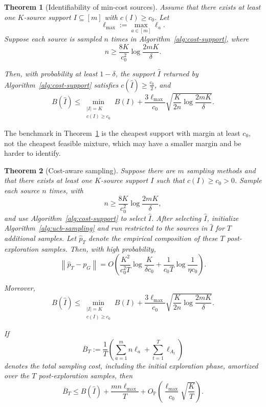 \documentclass[twoside]{article}
\newtheorem{theorem}{Theorem}
\begin{document}
\begin{theorem}[Identifiability of min-cost sources]
\label{thm:cost-support}
Assume that there exists at least one \(K\)-source support \(I\subseteq[m]\)
with $c(I)\geq c_0$. 
Let
\[
\ell_{\max}:=\max_{a\in[m]}\ell_a.
\]
Suppose each source is sampled \(n\) times in
Algorithm~\ref{alg:cost-support}, where
\[
n
\geq
\frac{8K}{c_0^2}
\log\frac{2mK}{\delta}.
\]

Then, with probability at least \(1-\delta\), the support
\(\widehat I\) returned by Algorithm~\ref{alg:cost-support} satisfies $c(\widehat I)\geq \frac{c_0}{2}$, 
and
\[
B(\widehat I)
\leq
\min_{\substack{|I|=K\\ c(I)\geq c_0}}
B(I)
+
\frac{3\ell_{\max}}{c_0}
\sqrt{
\frac{K}{2n}
\log\frac{2mK}{\delta}
}.
\]
\end{theorem}
The benchmark in Theorem~\ref{thm:cost-support} is the cheapest support
with margin at least \(c_0\), not the cheapest feasible mixture, which may
have a smaller margin and be harder to identify. 
\begin{theorem}[Cost-aware sampling]
\label{thm:cost-aware}
Suppose there are \(m\) sampling methods and that there exists at least one
\(K\)-source support \(I\) such that \(c(I)\ge c_0>0\). Sample each source
\(n\) times, with
\[
n\ge
\frac{8K}{c_0^2}
\log\frac{2mK}{\delta},
\]
and use Algorithm~\ref{alg:cost-support} to select \(\widehat I\). After selecting \(\widehat I\), initialize Algorithm~\ref{alg:ucb-sampling} and run restricted to the sources in \(\widehat I\)
for \(T\) additional samples. Let \(\widehat p_T\) denote the empirical
composition of these \(T\) post-exploration samples. Then, with high
probability,
\[
\left\|\widehat p_T-p_G\right\|
=
O\!\left(
\frac{K^2}{c_0^2T}
\log\frac{K}{\delta c_0}
+
\frac{1}{c_0T}
\log\frac{1}{\eta c_0}
\right).
\]

Moreover,
\[
B(\widehat I)
\le
\min_{\substack{|I|=K\\ c(I)\ge c_0}}
B(I)
+
\frac{3\ell_{\max}}{c_0}
\sqrt{
\frac{K}{2n}
\log\frac{2mK}{\delta}
}.
\]

If
\[
\overline B_T
:=
\frac{1}{T}
\left(
\sum_{a=1}^m n\ell_a
+
\sum_{t=1}^T \ell_{A_t}
\right)
\]
denotes the total sampling cost, including the initial exploration phase,
amortized over the \(T\) post-exploration samples, then
\[
\overline B_T
\le
B(\widehat I)
+
\frac{mn\ell_{\max}}{T}
+
O_{\mathbb P}\!\left(
\frac{\ell_{\max}}{c_0}
\sqrt{\frac{K}{T}}
\right).
\]
\end{theorem}
\end{document}
